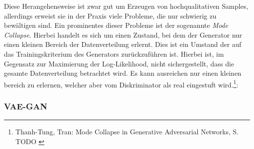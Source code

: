 Diese Herangehensweise ist zwar gut um Erzeugen von hochqualitativen Samples, allerdings erweist sie in der Praxis viele Probleme, die nur schwierig zu bewältigen sind. Ein prominentes dieser Probleme ist der sogenannte \textit{Mode Collapse}. Hierbei handelt es sich um einen Zustand, bei dem der Generator nur einen kleinen Bereich der Datenverteilung erlernt. Dies ist ein Umstand der auf das Trainingskriterium des Generators zurückzuführen ist. Hierbei ist, im Gegensatz zur Maximierung der Log-Likelihood, nicht sichergestellt, dass die gesamte Datenverteilung betrachtet wird. Es kann ausreichen nur einen kleinen bereich zu erlernen, welcher aber vom Diskriminator als real eingestuft wird.\footnote{
    Thanh-Tung, Tran: Mode Collapse in Generative Adversarial Networks, S. TODO
    \cite{thanhtung2020catastrophicforgettingmodecollapse}
}:

\subsubsection{VAE-GAN}

